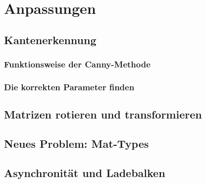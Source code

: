 \section{Anpassungen}

\subsection{Kantenerkennung}

\subsubsection{Funktionsweise der Canny-Methode}
\subsubsection{Die korrekten Parameter finden}

\subsection{Matrizen rotieren und transformieren}

\subsection{Neues Problem: Mat-Types}

\subsection{Asynchronität und Ladebalken}